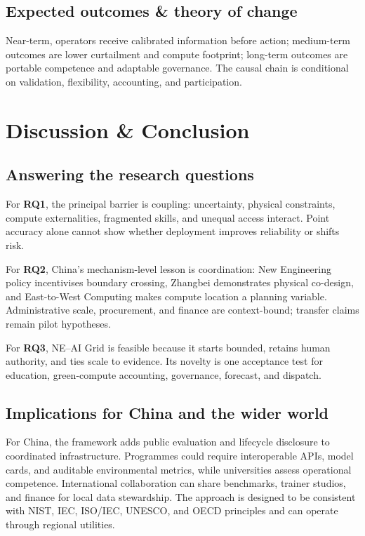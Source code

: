 \documentclass[12pt]{article}
\begin{document}
\subsection{Expected outcomes \& theory of change}
Near-term, operators receive calibrated information before action; medium-term outcomes are lower curtailment and compute footprint; long-term outcomes are portable competence and adaptable governance. The causal chain is conditional on validation, flexibility, accounting, and participation.

\section{Discussion \& Conclusion}

\subsection{Answering the research questions}
For \textbf{RQ1}, the principal barrier is coupling: uncertainty, physical constraints, compute externalities, fragmented skills, and unequal access interact. Point accuracy alone cannot show whether deployment improves reliability or shifts risk.

For \textbf{RQ2}, China's mechanism-level lesson is coordination: New Engineering policy incentivises boundary crossing, Zhangbei demonstrates physical co-design, and East-to-West Computing makes compute location a planning variable. Administrative scale, procurement, and finance are context-bound; transfer claims remain pilot hypotheses.

For \textbf{RQ3}, NE--AI Grid is feasible because it starts bounded, retains human authority, and ties scale to evidence. Its novelty is one acceptance test for education, green-compute accounting, governance, forecast, and dispatch.

\subsection{Implications for China and the wider world}
For China, the framework adds public evaluation and lifecycle disclosure to coordinated infrastructure. Programmes could require interoperable APIs, model cards, and auditable environmental metrics, while universities assess operational competence. International collaboration can share benchmarks, trainer studios, and finance for local data stewardship. The approach is designed to be consistent with NIST, IEC, ISO/IEC, UNESCO, and OECD principles and can operate through regional utilities.
\end{document}
